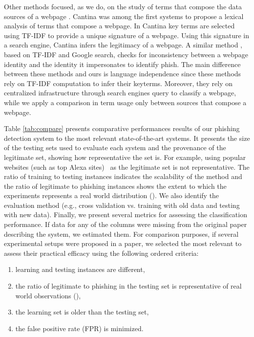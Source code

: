 \documentclass[10pt,conference,compsocconf,letterpaper]{IEEEtran}
\begin{document}
Other methods focused, as we do, on the study of terms that compose the data sources of a webpage \cite{Blum:2010:lexical,le:2011:phishdef,Marchal:2012:proactive,marchal:2014:phishstorm}. 
Cantina \cite{xiang:2011:cantina,zhang:2007:cantina} was among the first systems to propose a lexical analysis of terms that compose a webpage. In Cantina \cite{zhang:2007:cantina} key terms are selected  using TF-IDF to provide a unique signature of a webpage. Using this signature in a  search engine, Cantina infers the legitimacy of a webpage. A similar method \cite{Xiang:2009:hybrid}, based on TF-IDF and Google search, checks for inconsistency between a webpage identity and the identity it impersonates to identify phish. The main difference between these methods and ours is language independence since these methods rely on TF-IDF computation to infer their keyterms. Moreover, they rely on centralized infrastructure through search engines query to classify a webpage, while we apply a comparison in term usage only between sources that compose a webpage.


Table \ref{tab:compare} presents comparative performances results of our phishing detection system to the most relevant state-of-the-art systems. It presents the size of the testing sets used to evaluate each system and the provenance of the legitimate set, showing how representative the set is.  For example, using popular websites (such as top Alexa sites)~\cite{Chen:2014:anti,ramesh:2014:efficious} as the legitimate set is not representative. The ratio of training to testing instances indicates the scalability of the method and the ratio of legitimate to phishing instances shows the extent to which the experiments represents a real world distribution (). We also identify the evaluation method (e.g., cross validation vs. training with old data and testing with new data). Finally, we present several metrics for assessing the classification performance. If data for any of the columns were missing from the original paper describing the system, we estimated them.
For comparison purposes, if several experimental setups were proposed in a paper, we selected the most relevant to assess their practical efficacy using the following ordered criteria:

\begin{enumerate}[topsep=0pt,itemsep=-1ex,partopsep=0pt,parsep=1ex]
\item learning and testing instances are different,
 \item the ratio of legitimate to phishing in the testing set is representative of real world observations (),
 \item the learning set is older than the testing set,
 \item the false positive rate (FPR) is minimized.
\end{enumerate}
\end{document}
